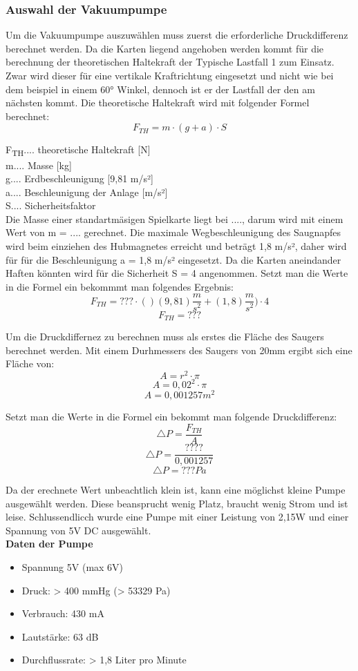 \subsubsection{Auswahl der Vakuumpumpe}
Um die Vakuumpumpe auszuwählen muss zuerst die erforderliche Druckdifferenz berechnet werden.
Da die Karten liegend angehoben werden kommt für die berechnung der theoretischen Haltekraft der Typische Lastfall 1
zum Einsatz. Zwar wird dieser für eine vertikale Kraftrichtung eingesetzt und nicht wie bei dem beispiel in einem
60° Winkel, dennoch ist er der Lastfall der den am nächsten kommt.
Die theoretische Haltekraft wird mit folgender Formel berechnet:
\begin{equation}
    F_{TH} = m \cdot (g + a) \cdot S
\end{equation}

    F\textsubscript{TH}.... theoretische Haltekraft [N] \\
    m.... Masse [kg]\\
    g.... Erdbeschleunigung [9,81 m/s²]\\
   a.... Beschleunigung der Anlage [m/s²]\\
    S.... Sicherheitsfaktor \\

Die Masse einer standartmäsigen Spielkarte liegt bei ...., darum wird mit einem Wert von m = .... gerechnet.
Die maximale Wegbeschleunigung des Saugnapfes wird  beim einziehen des Hubmagnetes erreicht und
beträgt 1,8 m/s²,
daher wird für für die Beschleunigung a = 1,8 m/s² eingesetzt. Da die Karten aneindander Haften könnten
wird für die Sicherheit S = 4 angenommen.
Setzt man die Werte in die Formel ein bekommmt man folgendes Ergebnis: \\
\[F_{TH}= ??? \cdot ()(9,81)\frac{m}{s^{2}}+(1,8)\frac{m}{s^{2}})\cdot 4\]
\[F_{TH}= ???\]

Um die Druckdiffernez zu berechnen muss als erstes die Fläche des Saugers berechnet werden.
Mit einem Durhmessers des Saugers von 20mm ergibt sich eine Fläche von:
\[A=r^{2}\cdot \pi\]
\[A=0,02^{2}\cdot \pi\]
\[A=0,001257m^{2}\]

Setzt man die Werte in die Formel ein bekommt man folgende Druckdifferenz:
\[\triangle P=\frac{F_{TH}}{A}\]
\[\triangle P=\frac{????}{0,001257}\]
\[\triangle P=???Pa\]

Da der erechnete Wert unbeachtlich klein ist, kann eine möglichst kleine Pumpe ausgewählt werden. Diese beansprucht
wenig Platz, braucht wenig Strom und ist leise. Schlussendlicch wurde eine Pumpe mit einer Leistung von 2,15W und einer
Spannung von 5V DC ausgewählt.\\
\textbf{Daten der Pumpe}
\begin{itemize}
    \item Spannung 5V (max 6V)
    \item Druck: > 400 mmHg (> 53329 Pa)
    \item Verbrauch: 430 mA
    \item Lautstärke: 63 dB
    \item Durchflussrate: > 1,8 Liter pro Minute
\end{itemize}



